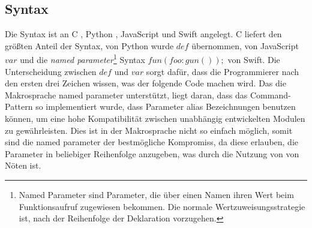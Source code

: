   \subsection{Syntax}
  \label{ssec:Syntax}
    Die Syntax ist an C \autocite{C-std}, Python \autocite{Python-std}, JavaScript \autocite{Ecma-std} und Swift \autocite{Swift-std} angelegt. C liefert den größten Anteil der Syntax, von Python wurde \myMIn$def$ übernommen, von JavaScript \myMIn$var$ und die \emph{named parameter}\footnote{
      Named Parameter sind Parameter, die über einen Namen ihren Wert beim Funktionsaufruf zugewiesen bekommen. Die normale Wertzuweisungsstrategie ist, nach der Reihenfolge der Deklaration vorzugehen.
    }
    Syntax \myMIn$fun(foo:gun());$ von Swift. Die Unterscheidung zwischen \myMIn$def$ und \myMIn$var$ sorgt dafür, dass die Programmierer nach den ersten drei Zeichen wissen, was der folgende Code machen wird. Das die Makrosprache named parameter unterstützt, liegt daran, dass das Command-Pattern so implementiert wurde, dass Parameter alias Bezeichnungen benutzen können, um eine hohe Kompatibilität zwischen unabhängig entwickelten Modulen zu gewährleisten. Dies ist in der Makrosprache nicht so einfach möglich, somit sind die named parameter der bestmögliche Kompromiss, da diese erlauben, die Parameter in beliebiger Reihenfolge anzugeben, was durch die Nutzung von  von Nöten ist.

